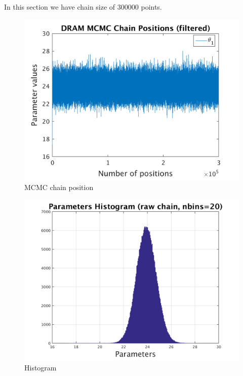 In this section we have chain size of 300000 points. 

\begin{figure}[H]
  
  \centering
   \includegraphics[scale=0.75]{100_results/outputData_300000/simple_ip_chain_pos_filt}
   \caption{MCMC chain position }
\end{figure}


\begin{figure}[H]
  
  \centering
   \includegraphics[scale=0.75]{100_results/outputData_300000/simple_ip_hist_raw}
   \caption{Histogram}
\end{figure}


